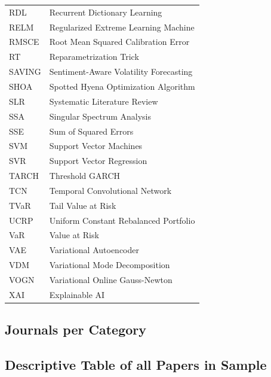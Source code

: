 \begin{table}[H]
\begin{subtable}[t]{0.49\textwidth}
\begin{tabular}{lp{}}
        RDL & Recurrent Dictionary Learning \\
        RELM & Regularized Extreme Learning Machine \\
        RMSCE & Root Mean Squared Calibration Error \\
        RT & Reparametrization Trick \\
        SAVING & Sentiment-Aware Volatility Forecasting \\
        SHOA & Spotted Hyena Optimization Algorithm \\
        SLR & Systematic Literature Review \\
        SSA & Singular Spectrum Analysis \\
        SSE & Sum of Squared Errors \\
        SVM & Support Vector Machines \\
        SVR & Support Vector Regression \\
        TARCH & Threshold GARCH \\
        TCN & Temporal Convolutional Network \\
        TVaR & Tail Value at Risk \\
        UCRP & Uniform Constant Rebalanced Portfolio \\
        VaR & Value at Risk \\
        VAE & Variational Autoencoder \\
        VDM & Variational Mode Decomposition \\
        VOGN & Variational Online Gauss-Newton \\
        XAI & Explainable AI \\
        \bottomrule
        \end{tabular}
    \end{subtable}
\end{table}



\subsection{Journals per Category}






\subsection{Descriptive Table of all Papers in Sample}
\label{appendix:descriptive_table_of_all_articles}

